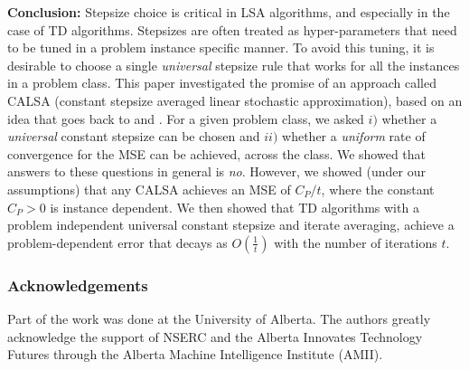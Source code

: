 \textbf{Conclusion:} 
Stepsize choice is critical in LSA algorithms, and especially in the case of TD algorithms.
Stepsizes are often treated as hyper-parameters that need to be tuned in a problem instance specific manner. To avoid this tuning, it is desirable to choose a single \emph{universal} stepsize rule that works for all the instances in a problem class. This paper investigated the promise of an approach called CALSA (constant stepsize averaged linear stochastic approximation), based on an idea that goes back to \citet{ruppert} and \citet{polyak-judisky}. For a given problem class, we asked $i)$ whether a \emph{universal} constant stepsize can be chosen and $ii)$ whether a \emph{uniform} rate of convergence for the MSE can be achieved, across the class. We showed that answers to these questions in general is \emph{no}. However, we showed (under our assumptions) that any CALSA achieves an MSE of $C_P/t$, where the constant $C_P>0$ is instance dependent. We then showed that TD algorithms with a problem independent universal constant stepsize and iterate averaging, achieve a problem-dependent error 
that decays as $O(\frac{1}{t})$ with the number of iterations $t$.
\subsubsection*{Acknowledgements}
Part of the work was done at the University of Alberta. The authors greatly acknowledge the
support of NSERC and the Alberta Innovates Technology
Futures through the Alberta Machine Intelligence
Institute (AMII).